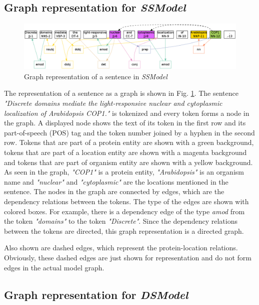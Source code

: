 \subsection{Graph representation for \textit{SSModel}}\label{sec:graphSSModel}

\begin{figure}
\centering
\includegraphics[scale=0.3]{figures/SameSentenceGraph.png}
\caption{Graph representation of a sentence in \textit{SSModel}}\label{fig:SSGraph}
\end{figure}

The representation of a sentence as a graph is shown in Fig. \ref{fig:SSGraph}. The sentence \textit{"Discrete domains mediate the light-responsive nuclear and cytoplasmic localization of Arabidopsis COP1."} is tokenized and every token forms a node in the graph. A displayed node shows the text of its token in the first row and its part-of-speech (POS) tag and the token number joined by a hyphen in the second row. Tokens that are part of a protein entity are shown with a green background, tokens that are part of a location entity are shown with a magenta background and tokens that are part of organism entity are shown with a yellow background. As seen in the graph, \textit{"COP1"} is a protein entity, \textit{"Arabidopsis"} is an organism name and \textit{"nuclear"} and \textit{"cytoplasmic"} are the locations mentioned in the sentence. The nodes in the graph are connected by edges, which are the dependency
 relations between the tokens. The type of the edges are shown with colored boxes. For example, there is a dependency edge of the type \textit{amod} from the token \textit{"domains"}  to  the token \textit{"Discrete"}. Since the dependency relations between the tokens are directed, this graph representation is a directed graph.

Also shown are dashed edges, which represent the protein-location relations. Obviously, these dashed edges are just shown for representation and do not form edges in the actual model graph.

\subsection{Graph representation for \textit{DSModel}}\label{sec:graphDSModel}

